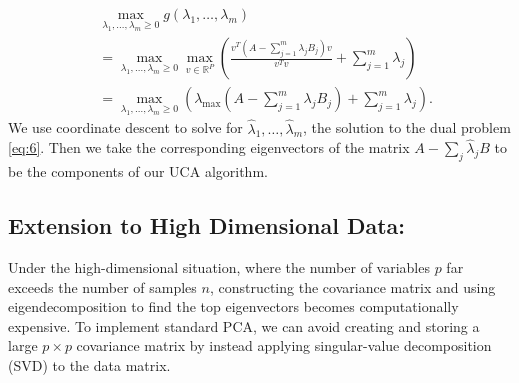 \documentclass[nocrop]{bioinfo}
\begin{document}
\begin{methods}
\begin{align}
    &\max_{\lambda_1,\ldots,\lambda_m \geq 0}{g(\lambda_1,\ldots,\lambda_m)} \nonumber \\ %
   &=\max_{\lambda_1,\ldots,\lambda_m \geq 0}{\max_{v \in \mathbb{R}^P}{\left(\frac{v^T\left(A - \sum^{m}_{j = 1}{\lambda_j B_j}\right)v}{v^T v} + \sum^{m}_{j=1}{\lambda_j}\right)}}\nonumber \\
   &=\max_{\lambda_1,\ldots,\lambda_m \geq 0}{\left(\lambda_{\text{max}}\left(A - \sum^{m}_{j = 1}{\lambda_j B_j}\right) + \sum^{m}_{j=1}{\lambda_j}\right)}.\label{eq:6}
\end{align}
We use coordinate descent to solve for $\hat{\lambda}_1, \ldots, \hat{\lambda}_m$, the solution to the dual problem \eqref{eq:6}. Then we take the corresponding eigenvectors of the matrix  $A - \sum_j \hat{\lambda}_j B$ to be the components of our UCA algorithm. 


\subsection{Extension to High Dimensional Data:}

Under the high-dimensional situation, where the number of variables $p$ far exceeds the number of samples $n$, constructing the covariance matrix and using eigendecomposition to find the top eigenvectors becomes computationally expensive. To implement standard PCA, we can avoid creating and storing a large $p \times p$ covariance matrix by instead applying singular-value decomposition (SVD) to the data matrix.


\end{methods}
\end{document}
